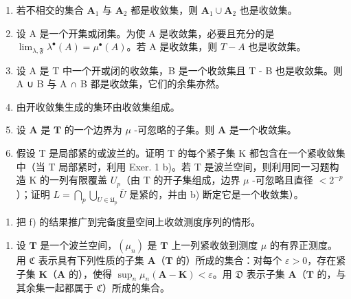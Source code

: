 \begin{enumerate}
\def\labelenumi{\alph{enumi})}
\item
  若不相交的集合 \(\mathbf{A}_1\) 与 \(\mathbf{A}_2\) 都是收敛集，则 \(\mathbf{A}_1 \cup \mathbf{A}_2\) 也是收敛集。
\item
  设 A 是一个开集或闭集。为使 A 是收敛集，必要且充分的是 \(\lim_{\lambda,\mathfrak{F}} \lambda^{\bullet}(A) = \mu^{\bullet}(A)\)。若 A 是收敛集，则 \(T - A\) 也是收敛集。
\item
  设 A 是 T 中一个开或闭的收敛集，B 是一个收敛集且 T - B 也是收敛集。则 A ∪ B 与 A ∩ B 都是收敛集，它们的余集亦然。
\item
  由开收敛集生成的集环由收敛集组成。
\item
  设 \(\mathbf{A}\) 是 \(\mathbf{T}\) 的一个边界为 \(\mu\) -可忽略的子集。则 \(\mathbf{A}\) 是一个收敛集。
\item
  假设 T 是局部紧的或波兰的。证明 T 的每个紧子集 K 都包含在一个紧收敛集中（当 T 局部紧时，利用 Exer. 1 b)。若 T 是波兰空间，则利用同一习题构造 K 的一列有限覆盖 \(U_{p}\)（由 T 的开子集组成，边界 \(\mu\) -可忽略且直径 \(<2^{-p}\)）；证明 \(L=\bigcap_{p}\bigcup_{U\in\mathfrak{U}_{p}}\overline{U}\) 是紧的，并由 b) 断定它是一个收敛集）。
\end{enumerate}


\begin{enumerate}
\def\labelenumi{\alph{enumi})}
\setcounter{enumi}{6}
\tightlist
\item
  把 f) 的结果推广到完备度量空间上收敛测度序列的情形。
\end{enumerate}

\begin{enumerate}
\def\labelenumi{\arabic{enumi})}
\setcounter{enumi}{2}
\tightlist
\item
  设 \(\mathbf{T}\) 是一个波兰空间，\((\mu_n)\) 是 \(\mathbf{T}\) 上一列紧收敛到测度 \(\mu\) 的有界正测度。用 \(\mathfrak{C}\) 表示具有下列性质的子集 \(\mathbf{A}\)（\(\mathbf{T}\) 的）所成的集合：对每个 \(\varepsilon > 0\)，存在紧子集 \(\mathbf{K}\)（\(\mathbf{A}\) 的），使得 \(\sup_{n} \mu_n(\mathbf{A} - \mathbf{K}) < \varepsilon\)。用 \(\mathfrak{D}\) 表示子集 \(\mathbf{A}\)（\(\mathbf{T}\) 的，与其余集一起都属于 \(\mathfrak{C}\)）所成的集合。
\end{enumerate}

